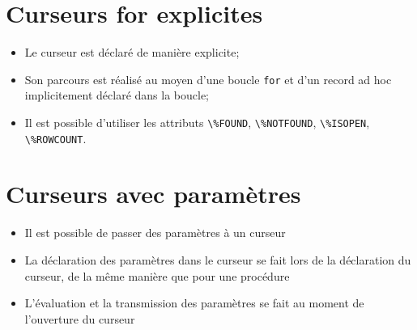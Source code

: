 \documentclass[10pt]{beamer}
\begin{document}
\section{Curseurs for explicites}
\begin{frame}{\secname}
    \begin{itemize}
        \item Le curseur est déclaré de manière explicite;
        \item Son parcours est réalisé au moyen d'une boucle \lstinline[language=plsql]!for! et d'un record ad hoc implicitement déclaré dans la boucle;
        \item Il est possible d'utiliser les attributs \lstinline[language=plsql]!\%FOUND!, \lstinline[language=plsql]!\%NOTFOUND!, \lstinline[language=plsql]!\%ISOPEN!, \lstinline[language=plsql]!\%ROWCOUNT!.
    \end{itemize}
\end{frame}

\begin{frame}{\secname}
    
\end{frame}



\section{Curseurs avec paramètres}
\begin{frame}{\secname}
    \begin{itemize}
        \item Il est possible de passer des paramètres à un curseur
        \item La déclaration des paramètres dans le curseur se fait lors de la déclaration du curseur, de la même manière que pour une procédure
        \item L'évaluation et la transmission des paramètres se fait au moment de l'ouverture du curseur
    \end{itemize}
\end{frame}

\begin{frame}{\secname}
    
\end{frame}

\begin{frame}[allowframebreaks]{\secname}
    
\end{frame}
\end{document}

